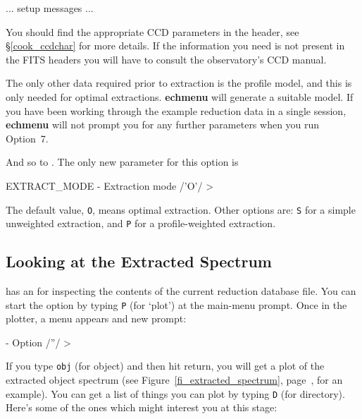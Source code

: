 \documentclass[twoside,11pt]{starlink}
\providecommand{\scspec}[2]{#1}
\begin{document}
{
\scspec{\small}{ }
\begin{terminalv}
   ... setup messages ...
\end{terminalv}
}

You should find the appropriate CCD parameters in the header, see
\scspec{\S\ref{cook_ccdchar}}
{\htmlref{Looking at FITS Header Cards: CCD Characteristics}{cook_ccdchar}}
for more details.  If the information you need is not present in the FITS
headers you will have to consult the observatory's CCD manual.

The only other data required prior to extraction is the profile model,
and this is only needed for optimal extractions.
\textbf{echmenu} 
will generate a suitable model.
If you have been working through the example reduction data in a
single session, \textbf{echmenu} will not prompt you for any further parameters
when you run Option~7.

And so to .
The only new parameter for this option is

{
\scspec{\small}{ }
\begin{terminalv}
   EXTRACT_MODE - Extraction mode /'O'/ >
\end{terminalv}
}

The default value, \verb+O+, means optimal extraction.  Other options are:
\verb+S+ for a simple unweighted extraction, and \verb+P+ for a
profile-weighted extraction.


\subsection{Looking at the Extracted Spectrum}

 has an
for inspecting the contents of the current reduction database file.
You can start the option by typing \verb+P+ (for `plot') at the
main-menu prompt.
Once in the plotter, a menu appears and new prompt:

{
\scspec{\small}{ }
\begin{terminalv}
    - Option /''/ >
\end{terminalv}
}




If you type \verb+obj+ (for object) and then hit return, you will get a
plot of the extracted object spectrum (see
\scspec{Figure~\ref{fi_extracted_spectrum},
page~\pageref{fi_extracted_spectrum},}{the figure above} for an example).
You can get a list of things you
can plot by typing \verb+D+ (for directory).  Here's some of the ones which
might interest you at this stage:
\end{document}
